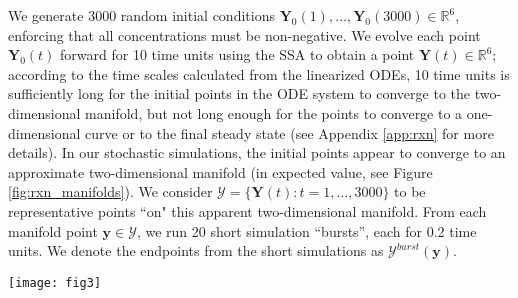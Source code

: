 \documentclass[aip,jcp,preprint]{revtex4-1}
\begin{document}
We generate 3000 random initial conditions $\mathbf{Y}_0(1), \dots, \mathbf{Y}_0(3000) \in \mathbb{R}^6$, enforcing that all concentrations
must be non-negative.
%
We evolve each point $\mathbf{Y}_0(t)$ forward for 10 time units using the SSA to obtain a point $\mathbf{Y}(t) \in \mathbb{R}^6$;
according to the time scales calculated from the linearized ODEs, 10 time units is sufficiently long for the initial points in the ODE system to converge to the two-dimensional manifold,
but not long enough for the points to converge to a one-dimensional curve or to the final steady state (see Appendix \ref{app:rxn} for more details).
%
In our stochastic simulations, the initial points appear to converge to an approximate two-dimensional manifold
(in expected value, see Figure \ref{fig:rxn_manifolds}).
%
We consider $\mathcal{Y} = \{ \mathbf{Y}(t): t=1, \dots, 3000 \}$ to be representative points ``on" this apparent two-dimensional manifold.
%
From each manifold point $\mathbf{y} \in \mathcal{Y}$, we run 20 short simulation ``bursts'', each for 0.2 time units.
%
We denote the endpoints from the short simulations as $\mathcal{Y}^{burst}(\mathbf{y})$.

\begin{figure*}[ht]
  \texttt{[image: fig3]}
    \caption{Projections of the data obtained from stochastic simulation of the chemical reaction network described in Section \ref{subsec:rxn_network}. The insets show rotations of the projections to illustrate the approximate two-dimensionality of the ``slow manifold''.}
    \label{fig:rxn_manifolds}
\end{figure*}
\end{document}
